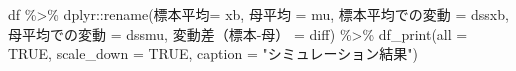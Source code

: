 \documentclass[]{tufte-handout}
\newenvironment{Shaded}{}{}
\newcommand{\AttributeTok}[1]{\textcolor[rgb]{0.49,0.56,0.16}{#1}}
\newcommand{\ConstantTok}[1]{\textcolor[rgb]{0.53,0.00,0.00}{#1}}
\newcommand{\FunctionTok}[1]{\textcolor[rgb]{0.02,0.16,0.49}{#1}}
\newcommand{\NormalTok}[1]{#1}
\newcommand{\OtherTok}[1]{\textcolor[rgb]{0.00,0.44,0.13}{#1}}
\newcommand{\SpecialCharTok}[1]{\textcolor[rgb]{0.25,0.44,0.63}{#1}}
\newcommand{\StringTok}[1]{\textcolor[rgb]{0.25,0.44,0.63}{#1}}
\begin{document}
\begin{Shaded}
\begin{Highlighting}[numbers=left,,]
\NormalTok{df }\SpecialCharTok{\%\textgreater{}\%} 
\NormalTok{  dplyr}\SpecialCharTok{::}\FunctionTok{rename}\NormalTok{(}\StringTok{\textasciigrave{}}\AttributeTok{標本平均}\StringTok{\textasciigrave{}}\OtherTok{=}\NormalTok{ xb, }\StringTok{\textasciigrave{}}\AttributeTok{母平均}\StringTok{\textasciigrave{}} \OtherTok{=}\NormalTok{ mu,}
                \StringTok{\textasciigrave{}}\AttributeTok{標本平均での変動}\StringTok{\textasciigrave{}} \OtherTok{=}\NormalTok{ dssxb, }\StringTok{\textasciigrave{}}\AttributeTok{母平均での変動}\StringTok{\textasciigrave{}} \OtherTok{=}\NormalTok{ dssmu,}
                \StringTok{\textasciigrave{}}\AttributeTok{変動差（標本{-}母）}\StringTok{\textasciigrave{}} \OtherTok{=}\NormalTok{ diff) }\SpecialCharTok{\%\textgreater{}\%} 
  \FunctionTok{df\_print}\NormalTok{(}\AttributeTok{all =} \ConstantTok{TRUE}\NormalTok{, }\AttributeTok{scale\_down =} \ConstantTok{TRUE}\NormalTok{, }\AttributeTok{caption =} \StringTok{"シミュレーション結果"}\NormalTok{)}
\end{Highlighting}
\end{Shaded}
\end{document}
